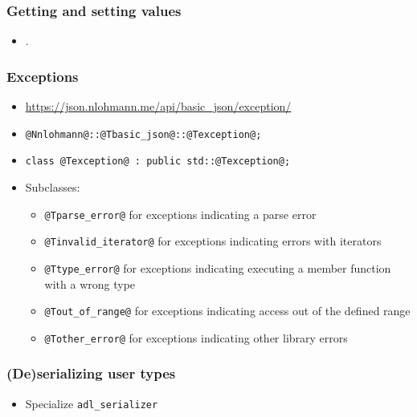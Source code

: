 \begin{frame}[fragile]\frametitle{Getting and setting values}
  \begin{itemize}
    \item .
  \end{itemize}
\end{frame}

\begin{frame}[fragile]\frametitle{Exceptions}
  \begin{itemize}
    \item {\footnotesize\url{https://json.nlohmann.me/api/basic_json/exception/}}
    \item \lstinline{@Nnlohmann@::@Tbasic_json@::@Texception@;}
    \item \lstinline{class @Texception@ : public std::@Texception@;}
    \item Subclasses:
    \begin{itemize}
      \item \lstinline{@Tparse_error@}
        for exceptions indicating a parse error
      \item \lstinline{@Tinvalid_iterator@}
        for exceptions indicating errors with iterators
      \item \lstinline{@Ttype_error@}
        for exceptions indicating executing a member function with a wrong type
      \item \lstinline{@Tout_of_range@}
        for exceptions indicating access out of the defined range
      \item \lstinline{@Tother_error@}
        for exceptions indicating other library errors
    \end{itemize}
  \end{itemize}
\end{frame}

\begin{frame}\frametitle{(De)serializing user types}
  \begin{itemize}
    \item Specialize \lstinline{adl_serializer}
  \end{itemize}
\end{frame}
